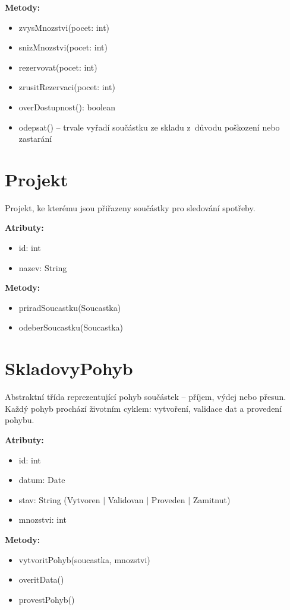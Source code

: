 \textbf{Metody:}\begin{itemize}[noitemsep,topsep=2pt]\item zvysMnozstvi(pocet: int)\item snizMnozstvi(pocet: int)\item rezervovat(pocet: int)\item zrusitRezervaci(pocet: int)\item overDostupnost(): boolean\item odepsat() -- trvale vyřadí součástku ze skladu z~důvodu poškození nebo zastarání\end{itemize}

\section{Projekt}

Projekt, ke kterému jsou přiřazeny součástky pro sledování spotřeby.

\textbf{Atributy:}\begin{itemize}[noitemsep,topsep=2pt]\item id: int\item nazev: String\end{itemize}

\textbf{Metody:}\begin{itemize}[noitemsep,topsep=2pt]\item priradSoucastku(Soucastka)\item odeberSoucastku(Soucastka)\end{itemize}

\section{SkladovyPohyb}

Abstraktní třída reprezentující pohyb součástek -- příjem, výdej nebo přesun. Každý pohyb prochází životním cyklem: vytvoření, validace dat a provedení pohybu.

\textbf{Atributy:}\begin{itemize}[noitemsep,topsep=2pt]\item id: int\item datum: Date\item stav: String (Vytvoren $|$ Validovan $|$ Proveden $|$ Zamitnut)\item mnozstvi: int\end{itemize}

\textbf{Metody:}\begin{itemize}[noitemsep,topsep=2pt]\item vytvoritPohyb(soucastka, mnozstvi)\item overitData()\item provestPohyb()\end{itemize}

